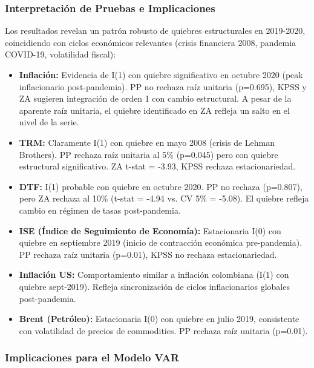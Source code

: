 \documentclass[12pt,a4paper]{article}
\begin{document}
\subsubsection{Interpretación de Pruebas e Implicaciones}

Los resultados revelan un patrón robusto de quiebres estructurales en 2019-2020, coincidiendo con ciclos económicos relevantes (crisis financiera 2008, pandemia COVID-19, volatilidad fiscal):

\begin{itemize}
\item \textbf{Inflación:} Evidencia de I(1) con quiebre significativo en octubre 2020 (peak inflacionario post-pandemia). PP no rechaza raíz unitaria (p=0.695), KPSS y ZA sugieren integración de orden 1 con cambio estructural. A pesar de la aparente raíz unitaria, el quiebre identificado en ZA refleja un salto en el nivel de la serie.

\item \textbf{TRM:} Claramente I(1) con quiebre en mayo 2008 (crisis de Lehman Brothers). PP rechaza raíz unitaria al 5\% (p=0.045) pero con quiebre estructural significativo. ZA t-stat = -3.93, KPSS rechaza estacionariedad.

\item \textbf{DTF:} I(1) probable con quiebre en octubre 2020. PP no rechaza (p=0.807), pero ZA rechaza al 10\% (t-stat = -4.94 vs. CV 5\% = -5.08). El quiebre refleja cambio en régimen de tasas post-pandemia.

\item \textbf{ISE (Índice de Seguimiento de Economía):} Estacionaria I(0) con quiebre en septiembre 2019 (inicio de contracción económica pre-pandemia). PP rechaza raíz unitaria (p=0.01), KPSS no rechaza estacionariedad.

\item \textbf{Inflación US:} Comportamiento similar a inflación colombiana (I(1) con quiebre sept-2019). Refleja sincronización de ciclos inflacionarios globales post-pandemia.

\item \textbf{Brent (Petróleo):} Estacionaria I(0) con quiebre en julio 2019, consistente con volatilidad de precios de commodities. PP rechaza raíz unitaria (p=0.01).
\end{itemize}

\subsubsection{Implicaciones para el Modelo VAR}
\end{document}
